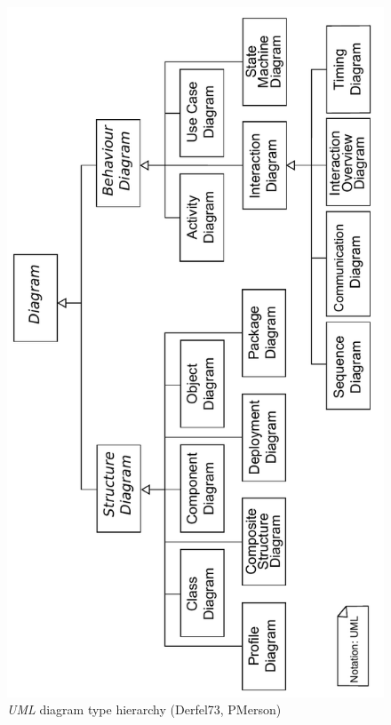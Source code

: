 \documentclass{llncs}
\begin{document}
\begin{figure}[h!t]
 \centering
 \includegraphics[scale=0.55,angle=270]{images/uml}
 \caption{\textit{UML} diagram type hierarchy (Derfel73, PMerson)}
 \label{fig:uml}
\end{figure}
\end{document}
